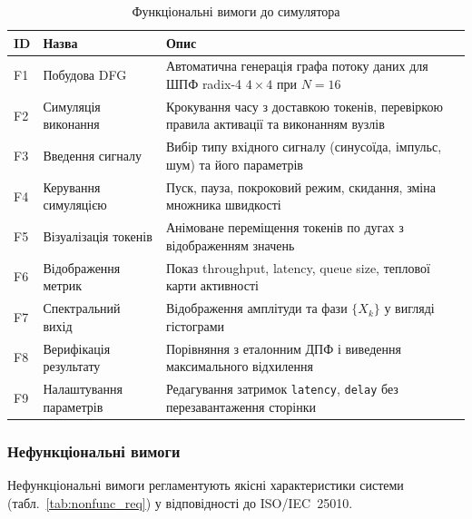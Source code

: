 \begin{table}[H]
  \caption{Функціональні вимоги до симулятора}
  \label{tab:func_req}
  \centering
  \small
  \begin{tabular}{p{1.4cm}p{4.5cm}p{7.5cm}}
    \toprule
    ID & Назва & Опис \\
    \midrule
    F1 & Побудова DFG & Автоматична генерація графа потоку даних для ШПФ radix-4 $4\times4$ при $N = 16$ \\
    F2 & Симуляція виконання & Крокування часу з доставкою токенів, перевіркою правила активації та виконанням вузлів \\
    F3 & Введення сигналу & Вибір типу вхідного сигналу (синусоїда, імпульс, шум) та його параметрів \\
    F4 & Керування симуляцією & Пуск, пауза, покроковий режим, скидання, зміна множника швидкості \\
    F5 & Візуалізація токенів & Анімоване переміщення токенів по дугах з відображенням значень \\
    F6 & Відображення метрик & Показ throughput, latency, queue size, теплової карти активності \\
    F7 & Спектральний вихід & Відображення амплітуди та фази $\{X_k\}$ у вигляді гістограми \\
    F8 & Верифікація результату & Порівняння з еталонним ДПФ і виведення максимального відхилення \\
    F9 & Налаштування параметрів & Редагування затримок \texttt{latency}, \texttt{delay} без перезавантаження сторінки \\
    \bottomrule
  \end{tabular}
\end{table}

\subsubsection*{Нефункціональні вимоги}

Нефункціональні вимоги регламентують якісні характеристики системи
(табл.~\ref{tab:nonfunc_req}) у відповідності до ISO/IEC~25010.

